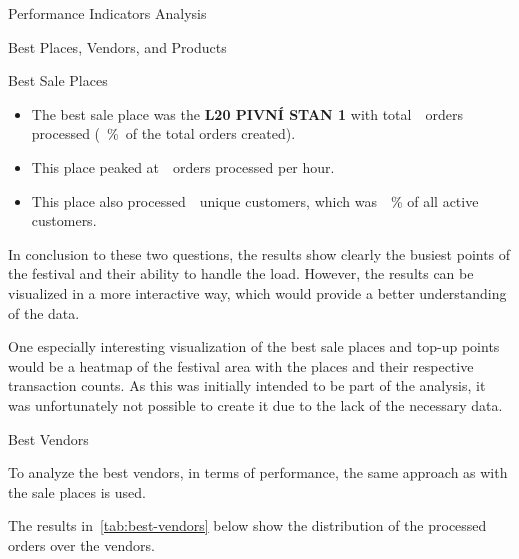 \begin{section}{Performance Indicators Analysis}
\begin{subsection}{Best Places, Vendors, and Products}
\begin{subsubsection}{Best Sale Places}
			\begin{keytakeaways}
				\begin{itemize}
					\item The best sale place was the \textbf{L20 PIVNÍ STAN 1} with total~~orders processed (~\%~of the total orders created).
					\item This place peaked at~~orders processed per hour.
					\item This place also processed~~unique customers, which was~~\% of all active customers.
				\end{itemize}
			\end{keytakeaways}

			In conclusion to these two questions, the results show clearly the busiest points of the festival and their ability to handle the load.
			However, the results can be visualized in a more interactive way, which would provide a better understanding of the data.

			One especially interesting visualization of the best sale places and top-up points would be a heatmap of the festival area with the places and their respective transaction counts.
			As this was initially intended to be part of the analysis, it was unfortunately not possible to create it due to the lack of the necessary data.
		\end{subsubsection}

		\begin{subsubsection}{Best Vendors}
			\label{subsubsec:analysis-best-vendors}

			To analyze the best vendors, in terms of performance, the same approach as with the sale places is used.


			The results in~\autoref{tab:best-vendors} below show the distribution of the processed orders over the vendors.


\end{subsubsection}
\end{subsection}
\end{section}
